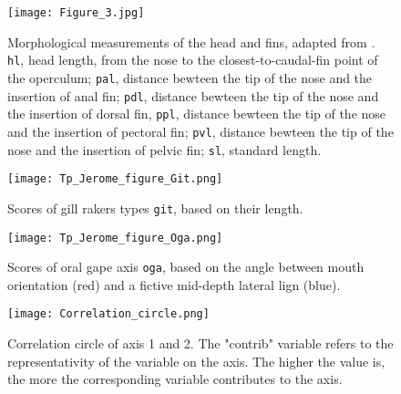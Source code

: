 \begin{figure} [!htbp]
	\begin{center}
		\texttt{[image: Figure\_3.jpg]}
		\caption[Fins morphological measurements]{Morphological measurements of the head and fins, adapted from \citet{keat-chuanng2017,habib2019}. \texttt{hl}, head length, from the nose to the closest-to-caudal-fin point of the operculum; \texttt{pal}, distance bewteen the tip of the nose and the insertion of anal fin; \texttt{pdl}, distance bewteen the tip of the nose and the insertion of dorsal fin, \texttt{ppl}, distance bewteen the tip of the nose and the insertion of pectoral fin; \texttt{pvl}, distance bewteen the tip of the nose and the insertion of pelvic fin;  \texttt{sl}, standard length.}
		\label{fig:fin}
	\end{center}
	
\end{figure}


\begin{figure} [!htbp]
	\begin{center}
	\begin{minipage}{0.45\textwidth}
		\centering
		\texttt{[image: Tp\_Jerome\_figure\_Git.png]}
		\caption[Gill raker types categorical scores]{Scores of gill rakers types \texttt{git}, based on their length.}
		\label{fig:git}
	\end{minipage}\hfill
	\begin{minipage}{0.45\textwidth}
		\centering
		\texttt{[image: Tp\_Jerome\_figure\_Oga.png]}
		\caption[Oral gape axis categorical scores]{Scores of oral gape axis \texttt{oga}, based on the angle between mouth orientation (red) and a fictive mid-depth lateral lign (blue).}
		\label{fig:oga}
	\end{minipage}
	\end{center}
	
\end{figure}

\begin{figure} [!htbp]
	\begin{center}
		\texttt{[image: Correlation\_circle.png]}
	\end{center}
	\caption[FAMD's correlation circle for first and second axis]{Correlation circle of axis 1 and 2. The "contrib" variable refers to the representativity of the variable on the axis. The higher the value is, the more the corresponding variable contributes to the axis.}
	\label{fig:corr_circ_12}
\end{figure}

